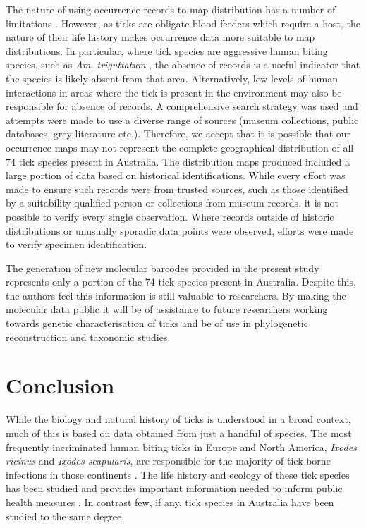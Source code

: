 \documentclass[a4paper, nobind]{templates/ociamthesis}
\begin{document}
The nature of using occurrence records to map distribution has a number of limitations \autocite{fourcadeComparingSpeciesDistributions2016}.
However, as ticks are obligate blood feeders which require a host, the nature of their life history makes occurrence data more suitable to map distributions.
In particular, where tick species are aggressive human biting species, such as \emph{Am. triguttatum} \autocite{gravesTickborneInfectiousDiseases2017}, the absence of records is a useful indicator that the species is likely absent from that area.
Alternatively, low levels of human interactions in areas where the tick is present in the environment may also be responsible for absence of records.
A comprehensive search strategy was used and attempts were made to use a diverse range of sources (museum collections, public databases, grey literature etc.).
Therefore, we accept that it is possible that our occurrence maps may not represent the complete geographical distribution of all 74 tick species present in Australia.
The distribution maps produced included a large portion of data based on historical identifications.
While every effort was made to ensure such records were from trusted sources, such as those identified by a suitability qualified person or collections from museum records, it is not possible to verify every single observation.
Where records outside of historic distributions or unusually sporadic data points were observed, efforts were made to verify specimen identification.

The generation of new molecular barcodes provided in the present study represents only a portion of the 74 tick species present in Australia.
Despite this, the authors feel this information is still valuable to researchers.
By making the molecular data public it will be of assistance to future researchers working towards genetic characterisation of ticks and be of use in phylogenetic reconstruction and taxonomic studies.

\hypertarget{conclusion}{%
\section{Conclusion}\label{conclusion}}

While the biology and natural history of ticks is understood in a broad context, much of this is based on data obtained from just a handful of species.
The most frequently incriminated human biting ticks in Europe and North America, \emph{Ixodes ricinus} and \emph{Ixodes scapularis}, are responsible for the majority of tick-borne infections in those continents \autocite{eisenBlackleggedTickIxodes2018,grayWhatWeStill2021}.
The life history and ecology of these tick species has been studied and provides important information needed to inform public health measures \autocite{grayWhatWeStill2021}.
In contrast few, if any, tick species in Australia have been studied to the same degree.
\end{document}
